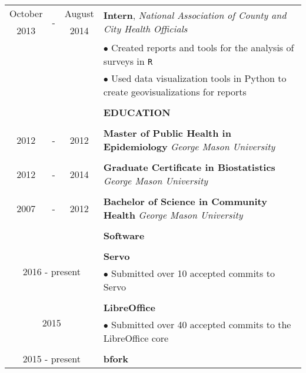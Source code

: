 \documentclass[10pt]{article}
\begin{document}
\begin{table}[ht]
\begin{tabular}{@{\hspace{0mm}}c@{\hspace{1mm}}c@{\hspace{3mm}}cl}
            October & \multirow{2}{*}{-} & August & \multirow{2}{*}{\textbf{Intern}, \textit{National Association of County and City Health Officials}}\\
            2013 & & 2014 &\\
            & & & $\bullet$ Created reports and tools for the analysis of surveys in \texttt{R}\\
            & & & $\bullet$ Used data visualization tools in Python to create geovisualizations for reports\\
            & & & \color{maroon}{\rule{14cm}{0.75pt}}\\
            & & & \large{\textbf{EDUCATION}}\\
            & & & \color{maroon}{\rule{14cm}{0.75pt}}\\
            2012 & - & 2012 & \textbf{Master of Public Health in Epidemiology} \textit{George Mason University}\\
            \\
            2012 & - & 2014 & \textbf{Graduate Certificate in Biostatistics} \textit{George Mason University}\\
            \\
            2007 & - & 2012 & \textbf{Bachelor of Science in Community Health} \textit{George Mason University}\\
            & & & \color{maroon}{\rule{14cm}{0.75pt}}\\
            & & & \large{\textbf{Software}}\\
            & & & \color{maroon}{\rule{14cm}{0.75pt}}\\
            \multicolumn{3}{c}{\multirow{2}{*}{2016 - present}} & \textbf{Servo}\\
            & & & $\bullet$ Submitted over 10 accepted commits to Servo\\
            \\
            \multicolumn{3}{c}{\multirow{2}{*}{2015}} & \textbf{LibreOffice}\\
            & & & $\bullet$ Submitted over 40 accepted commits to the LibreOffice core\\
            \\
            \multicolumn{3}{c}{\multirow{3}{*}{2015 - present}} & \textbf{bfork}\\

\end{tabular}
\end{table}
\end{document}
